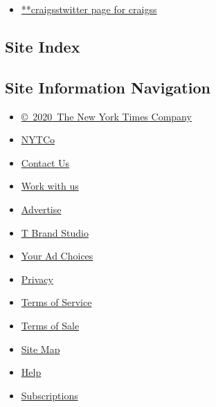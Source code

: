\begin{itemize}
\tightlist
\item
  \href{https://twitter.com/craigss}{**craigsstwitter page for craigss}
\end{itemize}

\hypertarget{site-index}{%
\subsection{Site Index}\label{site-index}}

\hypertarget{site-information-navigation}{%
\subsection{Site Information
Navigation}\label{site-information-navigation}}

\begin{itemize}
\tightlist
\item
  \href{https://help.nytimes.com/hc/en-us/articles/115014792127-Copyright-notice}{©~2020~The
  New York Times Company}
\end{itemize}

\begin{itemize}
\tightlist
\item
  \href{https://www.nytco.com/}{NYTCo}
\item
  \href{https://help.nytimes.com/hc/en-us/articles/115015385887-Contact-Us}{Contact
  Us}
\item
  \href{https://www.nytco.com/careers/}{Work with us}
\item
  \href{https://nytmediakit.com/}{Advertise}
\item
  \href{http://www.tbrandstudio.com/}{T Brand Studio}
\item
  \href{https://www.nytimes.com/privacy/cookie-policy\#how-do-i-manage-trackers}{Your
  Ad Choices}
\item
  \href{https://www.nytimes.com/privacy}{Privacy}
\item
  \href{https://help.nytimes.com/hc/en-us/articles/115014893428-Terms-of-service}{Terms
  of Service}
\item
  \href{https://help.nytimes.com/hc/en-us/articles/115014893968-Terms-of-sale}{Terms
  of Sale}
\item
  \href{https://spiderbites.nytimes.com}{Site Map}
\item
  \href{https://help.nytimes.com/hc/en-us}{Help}
\item
  \href{https://www.nytimes.com/subscription?campaignId=37WXW}{Subscriptions}
\end{itemize}
